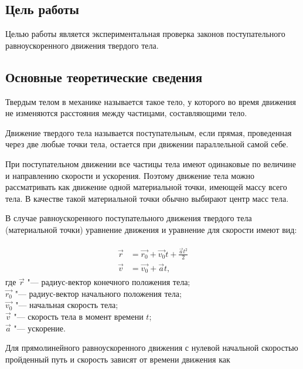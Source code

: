 \documentclass[a4paper, 12pt]{extarticle}
\begin{document}
\MTDTitlePage
\MTDInfoPage

\setcounter{section}{2}

\subsection{Цель работы}
Целью работы является экспериментальная проверка законов поступательного равноускоренного движения твердого тела.

\subsection{Основные теоретические сведения}
Твердым телом в механике называется такое тело, у которого во время движения не изменяются расстояния между частицами, составляющими тело.

Движение твердого тела называется поступательным, если прямая, проведенная через две любые точки тела, остается при движении параллельной самой себе.

При поступательном движении все частицы тела имеют одинаковые по величине и направлению скорости и ускорения. Поэтому движение тела можно рассматривать как движение одной материальной точки, имеющей массу всего тела. В качестве такой материальной точки обычно выбирают центр масс тела.

В случае равноускоренного поступательного движения твердого тела (материальной точки) уравнение движения и уравнение для скорости имеют вид:

\begin{align}
\label{eq:m2-uni-acc-motion}
\begin{split}
\vec{r} &= \vec{r_0} + \vec{v_0}t + \frac{\vec{a}t^2}{2} \\ %
\vec{v} &= \vec{v_0} + \vec{a}t,
\end{split}
\end{align}
где $\vec{r}$ "--- радиус-вектор конечного положения тела; \\
$\vec{r_0}$ "--- радиус-вектор начального положения тела; \\
$\vec{v_0}$ "--- начальная скорость тела; \\
$\vec{v}$ "--- скорость тела в момент времени $t$; \\
$\vec{a}$ "--- ускорение. %

Для прямолинейного равноускоренного движения с нулевой начальной скоростью пройденный путь и скорость зависят от времени движения как %
\end{document}
